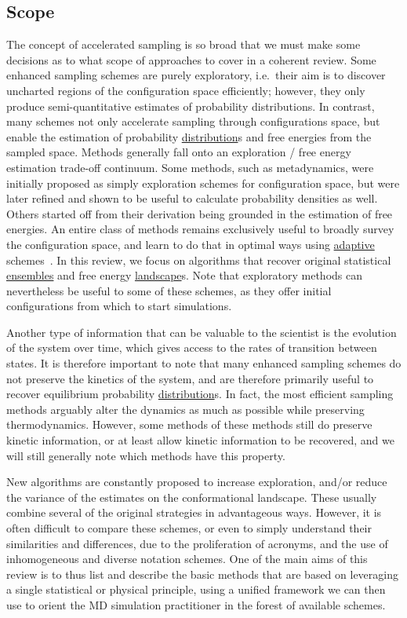 \documentclass[9pt,review]{livecoms}
\begin{document}
\subsection{Scope}
The concept of accelerated sampling is so broad that we must make some decisions as to what scope of approaches to cover in a coherent review.
Some enhanced sampling schemes are purely exploratory, i.e.~their aim is to discover uncharted regions of the configuration space efficiently; however, they only produce semi-quantitative estimates of probability distributions. In contrast, many schemes not only accelerate sampling through configurations space, but enable the estimation of probability \hyperlink{ref:Distribution} {distribution}s and free energies from the sampled space. Methods generally fall onto an exploration / free energy estimation trade-off continuum. Some methods, such as metadynamics, were initially proposed as simply exploration schemes for configuration space, but were later refined and shown to be useful to calculate probability densities as well.  Others started off from their derivation being grounded in the estimation of free energies. An entire class of methods remains exclusively useful to broadly survey the configuration space, and learn to do that in optimal ways using \hyperlink{ref:Adaptive} {adaptive} schemes~\cite{ChiavazzoE5494}. In this review, we focus on algorithms that recover original statistical \hyperlink{ref:Ensemble} {ensembles} and free energy \hyperlink{ref:FES} {landscape}s. Note that exploratory methods can nevertheless be useful to some of these schemes, as they offer initial configurations from which to start simulations.

Another type of information that can be valuable to the scientist is the evolution of the system over time, which gives access to the rates of transition between states. It is therefore important to note that many enhanced sampling schemes do not preserve the kinetics of the system, and are therefore primarily useful to recover equilibrium probability \hyperlink{ref:Distribution} {distribution}s. In fact, the most efficient sampling methods arguably alter the dynamics as much as possible while preserving thermodynamics. However, some methods of these methods still do preserve kinetic information, or at least allow kinetic information to be recovered, and we will still generally note which methods have this property.

New algorithms are constantly proposed to increase exploration, and/or reduce the variance of the estimates on the conformational landscape. These usually combine several of the original strategies in advantageous ways. However, it is often difficult to compare these schemes, or even to simply understand their similarities and differences, due to the proliferation of acronyms, and the use of inhomogeneous and diverse notation schemes. One of the main aims of this review is to thus list and describe the basic methods that are based on leveraging a single statistical or physical principle, using a unified framework we can then use to orient the MD simulation practitioner in the forest of available schemes.
\end{document}

